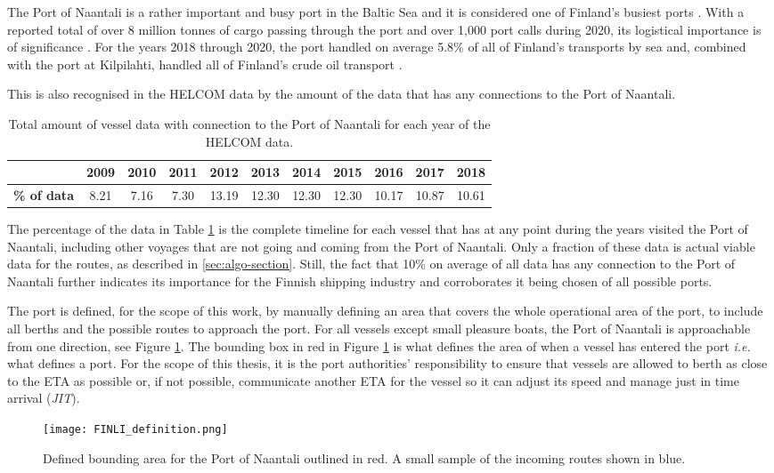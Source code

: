 \documentclass[../main.tex]{subfiles}
\begin{document}
The Port of Naantali is a rather important and busy port in the Baltic Sea and it is considered one of Finland's busiest ports \cite{SVRY_2022}. With a reported total of over 8 million tonnes of cargo passing through the port and over 1,000 port calls during 2020, its logistical importance is of significance \cite{PoN_2021}. For the years 2018 through 2020, the port handled on average 5.8\% of all of Finland's transports by sea and, combined with the port at Kilpilahti, handled all of Finland's crude oil transport \cite{TRAFICOM_2021}.

This is also recognised in the HELCOM data by the amount of the data that has any connections to the Port of Naantali.

\begin{table}[H]
\centering
\begin{tabular}{|l|c|c|c|c|c|c|c|c|c|c|}
\hline
\rowcolor[HTML]{C0C0C0} 
\multicolumn{1}{|r|}{\cellcolor[HTML]{C0C0C0}\textbf{Year}} & \textbf{2009} & \textbf{2010} & \textbf{2011} & \textbf{2012} & \textbf{2013} & \textbf{2014} & \textbf{2015} & \textbf{2016} & \textbf{2017} & \textbf{2018} \\ \hline
\textbf{\% of data}                           & 8.21          & 7.16          & 7.30          & 13.19         & 12.30         & 12.30         & 12.30         & 10.17         & 10.87         & 10.61         \\ \hline
\end{tabular}
\caption{Total amount of vessel data with connection to the Port of Naantali for each year of the HELCOM data.}
\label{tab:HELCOM-data-percent}
\end{table}

The percentage of the data in Table \ref{tab:HELCOM-data-percent} is the complete timeline for each vessel that has at any point during the years visited the Port of Naantali, including other voyages that are not going and coming from the Port of Naantali. Only a fraction of these data is actual viable data for the routes, as described in \ref{sec:algo-section}. Still, the fact that 10\% on average of all data has any connection to the Port of Naantali further indicates its importance for the Finnish shipping industry and corroborates it being chosen of all possible ports.

The port is defined, for the scope of this work, by manually defining an area that covers the whole operational area of the port, to include all berths and the possible routes to approach the port. For all vessels except small pleasure boats, the Port of Naantali is approachable from one direction, see Figure \ref{fig:FINLI-box}. The bounding box in red in Figure \ref{fig:FINLI-box} is what defines the area of when a vessel has entered the port \textit{i.e.} what defines a port. For the scope of this thesis, it is the port authorities' responsibility to ensure that vessels are allowed to berth as close to the ETA as possible or, if not possible, communicate another ETA for the vessel so it can adjust its speed and manage just in time arrival (\textit{JIT}).

\begin{figure}[H]
\centering
\texttt{[image: FINLI\_definition.png]}
\caption{Defined bounding area for the Port of Naantali outlined in red. A small sample of the incoming routes shown in blue.}
\label{fig:FINLI-box}
\end{figure}
\end{document}
